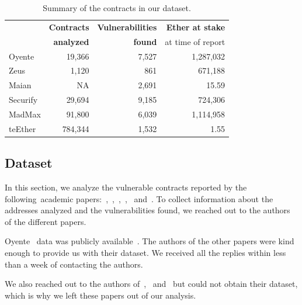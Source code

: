 \begin{table}
  \centering
  \caption{Summary of the contracts in our dataset.}
  \label{fig:dataset-stats}
  \setlength{\tabcolsep}{10pt}
  \begin{tabular}{lrrr}
    \toprule
    \bf \multirow{2}{*}{Name} & \bf Contracts & \bf Vulnerabilities & \bf Ether at stake         \\
                              & \bf analyzed  & \bf found           & {\small at time of report} \\
    \midrule
    Oyente                    & 19,366        & 7,527               & 1,287,032                  \\
    Zeus                      & 1,120         & 861                 & 671,188                    \\
    Maian                     & NA            & 2,691               & 15.59                      \\
    Securify                  & 29,694        & 9,185               & 724,306                    \\
    MadMax                    & 91,800        & 6,039               & 1,114,958                  \\
    teEther                   & 784,344       & 1,532               & 1.55                       \\
    \bottomrule
  \end{tabular}
\end{table}

\subsection{Dataset}
\label{sec:5a:datasets}
In this section, we analyze the vulnerable contracts reported by the following~\PapersAnalyzed academic papers:~\cite{luu2016a},~\cite{DBLP:conf/ndss/KalraGDS18},~\cite{Nikolic2018a},~\cite{Tsankov2018},~\cite{Grech2018} and~\cite{Krupp2018}. To collect information about the addresses analyzed and the vulnerabilities found, we reached out to the authors of the different papers.

Oyente~\cite{luu2016a} data was publicly available~\cite{oyente-benchmarks}. The authors of the other papers were kind enough to provide us with their dataset. We received all the replies within less than a week of contacting the authors.

We also reached out to the authors of~\cite{Tikhomirov2017},~\cite{Jiang2018} and~\cite{Brent2018} but could not obtain their dataset, which is why we left these papers out of our analysis.

